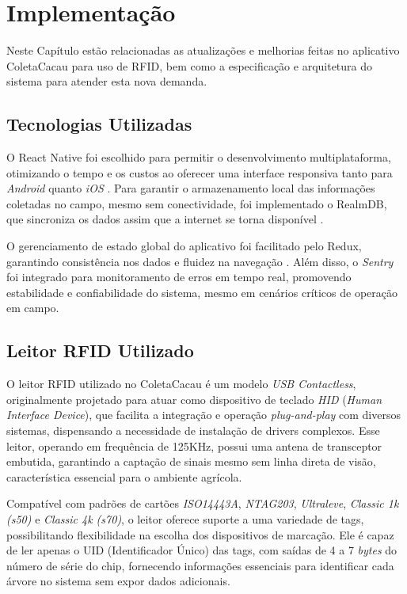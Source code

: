 \chapter{Implementação}

Neste Capítulo estão relacionadas as atualizações e melhorias feitas no aplicativo ColetaCacau para uso de RFID, bem como a especificação e arquitetura do sistema para atender esta nova demanda.

\section{Tecnologias Utilizadas}
O React Native foi escolhido para permitir o desenvolvimento multiplataforma, otimizando o tempo e os custos ao oferecer uma interface responsiva tanto para \textit{Android} quanto \textit{iOS} \cite{Erz2020IoTBM}. Para garantir o armazenamento local das informações coletadas no campo, mesmo sem conectividade, foi implementado o RealmDB, que sincroniza os dados assim que a internet se torna disponível \cite{Appiah2024PlanteSaineAA}.

O gerenciamento de estado global do aplicativo foi facilitado pelo Redux, garantindo consistência nos dados e fluidez na navegação \cite{Akter2023AgroBasedMA}. Além disso, o \textit{Sentry} foi integrado para monitoramento de erros em tempo real, promovendo estabilidade e confiabilidade do sistema, mesmo em cenários críticos de operação em campo.

\section{Leitor RFID Utilizado}
O leitor RFID utilizado no ColetaCacau é um modelo \textit{USB Contactless}, originalmente projetado para atuar como dispositivo de teclado \textit{HID} (\textit{Human Interface Device}), que facilita a integração e operação \textit{plug-and-play} com diversos sistemas, dispensando a necessidade de instalação de drivers complexos. Esse leitor, operando em frequência de 125KHz, possui uma antena de transceptor embutida, garantindo a captação de sinais mesmo sem linha direta de visão, característica essencial para o ambiente agrícola.

Compatível com padrões de cartões \textit{ISO14443A}, \textit{NTAG203}, \textit{Ultraleve}, \textit{Classic 1k (s50)} e \textit{Classic 4k (s70)}, o leitor oferece suporte a uma variedade de tags, possibilitando flexibilidade na escolha dos dispositivos de marcação. Ele é capaz de ler apenas o UID (Identificador Único) das tags, com saídas de 4 a 7 \textit{bytes} do número de série do chip, fornecendo informações essenciais para identificar cada árvore no sistema sem expor dados adicionais.

